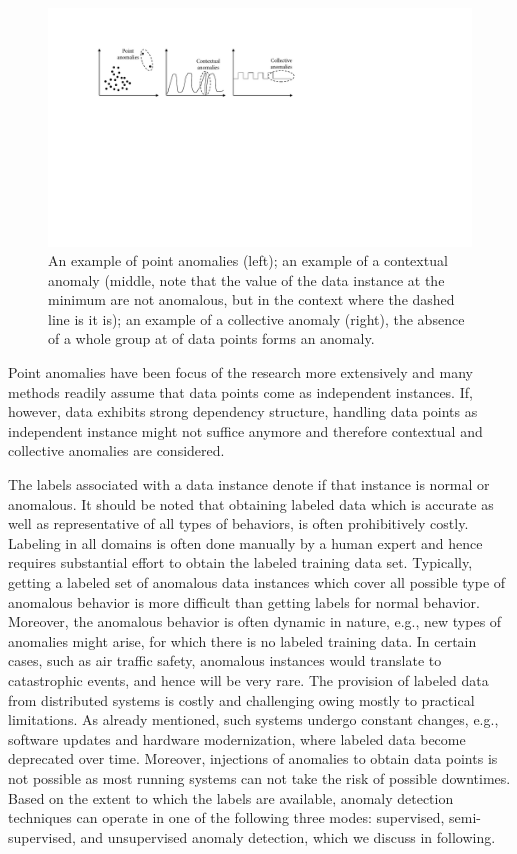 \begin{figure}[htbp]
\centerline{\includegraphics[width=1.0\textwidth]{gfx/chap2/typesofanomalies.pdf}}
\caption{An example of point anomalies (left); an example of a contextual anomaly (middle, note that the value of the data instance at the minimum are not anomalous, but in the context where the dashed line is it is); an example of a collective anomaly (right), the absence of a whole group at of data points forms an anomaly.}
\label{fig:typesofanomalies}
\end{figure}

Point anomalies have been focus of the research more extensively and many methods readily assume that data points come as independent instances. If, however, data exhibits strong dependency structure, handling data points as independent instance might not suffice anymore and therefore contextual and collective anomalies are considered. 

The labels associated with a data instance denote if that instance is normal or anomalous. It should be noted that obtaining labeled data which is accurate as well as representative of all types of behaviors, is often prohibitively costly. Labeling in all domains is often done manually by a human expert and hence requires substantial effort to obtain the labeled training data set. Typically, getting a labeled set of anomalous data instances which cover all possible type of anomalous behavior is more difficult than getting labels for normal behavior. Moreover, the anomalous behavior is often dynamic in nature, e.g., new types of anomalies might arise, for which there is no labeled training data. In certain cases, such as air traffic safety, anomalous instances would translate to catastrophic events, and hence will be very rare. The provision of labeled data from distributed systems is costly and challenging owing mostly to practical limitations. As already mentioned, such systems undergo constant changes, e.g., software updates and hardware modernization, where labeled data become deprecated over time. Moreover, injections of anomalies to obtain data points is not possible as most running systems can not take the risk of possible downtimes. Based on the extent to which the labels are available, anomaly detection techniques can operate in one of the following three modes: supervised, semi-supervised, and unsupervised anomaly detection, which we discuss in following.

